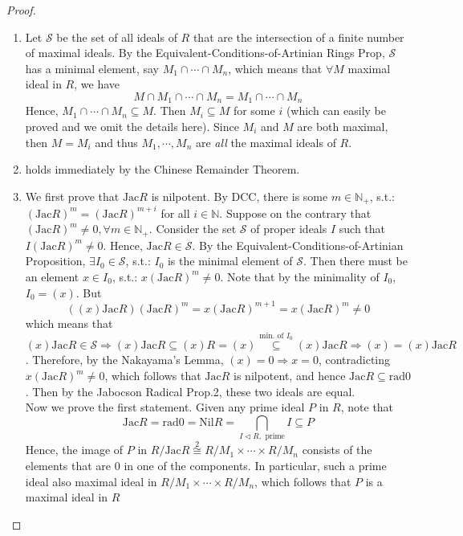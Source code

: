 \begin{proof}
    \begin{enumerate}
        \item Let $\mathcal{S}$ be the set of all ideals of $R$ that are the intersection of a finite number of maximal ideals. By the Equivalent-Conditions-of-Artinian Rings Prop, $\mathcal{S}$ has a minimal element, say $M_1 \cap \cdots \cap M_n$, which means that $\forall M$ maximal ideal in $R$, we have
        $$M \cap M_1 \cap \cdots \cap M_n =M_1 \cap \cdots \cap M_n$$
        Hence, $M_1 \cap \cdots \cap M_n \subseteq M$. Then $M_i \subseteq M$ for some $i$ (which can easily be proved and we omit the details here). Since $M_i$ and $M$ are both maximal, then $M=M_i$ and thus $M_1 ,\cdots, M_n$ are \textit{all} the maximal ideals of $R$.

        \item holds immediately by the Chinese Remainder Theorem.
        \item We first prove that $\text{Jac}R$ is nilpotent. By DCC, there is some $m \in \mathbb{N}_+$, s.t.: $(\text{Jac}R)^m = (\text{Jac}R)^{m+i}$ for all $i \in \mathbb{
        N
        }$. Suppose on the contrary that $(\text{Jac}R)^m \neq 0 ,\forall m\in \mathbb{N}_+$. Consider the set $\mathcal{S}$ of proper ideals $I$ such that $I(\text{Jac}R) ^m\neq 0$. Hence, $\text{Jac}R \in \mathcal{S}$. By the Equivalent-Conditions-of-Artinian Proposition, $\exists I_0 \in \mathcal{S}$, s.t.: $I_0$ is the minimal element of $\mathcal{S}$. Then there must be an element $x \in I_0$, s.t.: $x(\text{Jac}R)^m \neq 0$. Note that by the minimality of $I_0$, $I_0=(x)$. But
        $$((x) \text{Jac}R) (\text{Jac}R)^m =x (\text{Jac}R)^{m+1} = x (\text{Jac}R)^m \neq 0$$
        which means that $(x)\text{Jac}R \in \mathcal{S} \Rightarrow (x)\text{Jac}R \subseteq (x)R= (x) \overset{\text{min. of }I_0}{\subseteq} (x) \text{Jac}R \Rightarrow (x) =(x) \text{Jac}R$. Therefore, by the Nakayama's Lemma, $(x) =0 \Rightarrow x=0$, contradicting $x(\text{Jac}R)^m \neq 0$, which follows that $\text{Jac}R$ is nilpotent, and hence $\text{Jac}R \subseteq \text{rad}0$. Then by the Jabocson Radical Prop.2, these two ideals are equal.\\
        Now we prove the first statement. Given any prime ideal $P$ in $R$, note that
        $$\text{Jac}R =\text{rad} 0 =\text{Nil} R = \bigcap_{I \triangleleft R, \text{ prime}} I \subseteq P$$
        Hence, the image of $P$ in $R/\text{Jac}R \overset{2}{\cong} R/ M_1 \times \cdots \times R/M_n$ consists of the elements that are $0$ in one of the components. In particular, such a prime ideal also maximal ideal in $R/M_1 \times \cdots\times R/M_n$, which follows that $P$ is a maximal ideal in $R$


\end{enumerate}
\end{proof}
